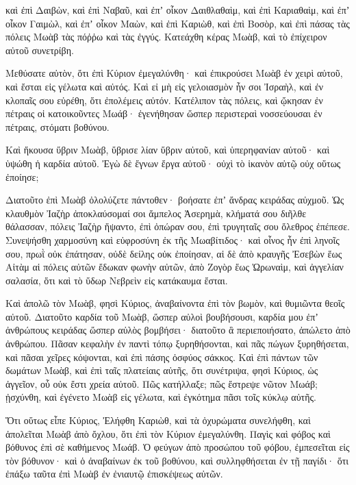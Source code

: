 {καὶ ἐπὶ Δαιβὼν, καὶ ἐπὶ Ναβαῦ, καὶ ἐπʼ οἶκον Δαιθλαθαὶμ,
καὶ ἐπὶ Καριαθαὶμ, καὶ ἐπʼ οἶκον Γαιμὼλ, καὶ ἐπʼ οἶκον Μαὼν,
καὶ ἐπὶ Καριὼθ, καὶ ἐπὶ Βοσὸρ, καὶ ἐπὶ πάσας τὰς πόλεις Μωὰβ τὰς πόῤῥω καὶ τὰς ἐγγύς.
Κατεάχθη κέρας Μωὰβ, καὶ τὸ ἐπίχειρον αὐτοῦ συνετρίβη.
\par }{\PP {}Μεθύσατε αὐτὸν, ὅτι ἐπὶ Κύριον ἐμεγαλύνθη· καὶ ἐπικρούσει Μωὰβ ἐν χειρὶ αὐτοῦ, καὶ ἔσται εἰς γέλωτα καὶ αὐτός.
Καὶ εἰ μὴ εἰς γελοιασμὸν ἦν σοι Ἰσραὴλ, καὶ ἐν κλοπαῖς σου εὑρέθη, ὅτι ἐπολέμεις αὐτόν.
Κατέλιπον τὰς πόλεις, καὶ ᾤκησαν ἐν πέτραις οἱ κατοικοῦντες Μωάβ· ἐγενήθησαν ὥσπερ περιστεραὶ νοσσεύουσαι ἐν πέτραις, στόματι βοθύνου.
\par }{\PP {}Καὶ ἤκουσα ὕβριν Μωὰβ, ὕβρισε λίαν ὕβριν αὐτοῦ, καὶ ὑπερηφανίαν αὐτοῦ· καὶ ὑψώθη ἡ καρδία αὐτοῦ.
Ἐγὼ δὲ ἔγνων ἔργα αὐτοῦ· οὐχὶ τὸ ἱκανὸν αὐτῷ οὐχ οὕτως ἐποίησε;
\par }{\PP {}Διατοῦτο ἐπὶ Μωὰβ ὀλολύζετε πάντοθεν· βοήσατε ἐπʼ ἄνδρας κειράδας αὐχμοῦ.
Ὡς κλαυθμὸν Ἰαζὴρ ἀποκλαύσομαί σοι ἄμπελος Ἀσερημὰ, κλήματά σου διῆλθε θάλασσαν, πόλεις Ἰαζὴρ ἥψαντο, ἐπὶ ὀπώραν σου, ἐπὶ τρυγηταῖς σου ὄλεθρος ἐπέπεσε.
Συνεψήσθη χαρμοσύνη καὶ εὐφροσύνη ἐκ τῆς Μωαβίτιδος· καὶ οἶνος ἦν ἐπὶ ληνοῖς σου, πρωῒ οὐκ ἐπάτησαν, οὐδὲ δείλης οὐκ ἐποίησαν,
αἱ δὲ ἀπὸ κραυγῆς Ἐσεβὼν ἕως Αἰτὰμ αἱ πόλεις αὐτῶν ἔδωκαν φωνὴν αὐτῶν, ἀπὸ Ζογὸρ ἕως Ὠρωναὶμ, καὶ ἀγγελίαν σαλασία, ὅτι καὶ τὸ ὕδωρ Νεβρεὶν εἰς κατάκαυμα ἔσται.
\par }{\PP {}Καὶ ἀπολῶ τὸν Μωὰβ, φησὶ Κύριος, ἀναβαίνοντα ἐπὶ τὸν βωμὸν, καὶ θυμιῶντα θεοῖς αὐτοῦ.
Διατοῦτο καρδία τοῦ Μωὰβ, ὥσπερ αὐλοὶ βουβήσουσι, καρδία μου ἐπʼ ἀνθρώπους κειράδας ὥσπερ αὐλὸς βομβήσει· διατοῦτο ἃ περιεποιήσατο, ἀπώλετο ἀπὸ ἀνθρώπου.
Πᾶσαν κεφαλὴν ἐν παντὶ τόπῳ ξυρηθήσονται, καὶ πᾶς πώγων ξυρηθήσεται, καὶ πᾶσαι χεῖρες κόψονται, καὶ ἐπὶ πάσης ὀσφύος σάκκος.
Καὶ ἐπὶ πάντων τῶν δωμάτων Μωὰβ, καὶ ἐπὶ ταῖς πλατείαις αὐτῆς, ὅτι συνέτριψα, φησὶ Κύριος, ὡς ἀγγεῖον, οὗ οὐκ ἔστι χρεία αὐτοῦ.
Πῶς κατήλλαξε; πῶς ἔστρεψε νῶτον Μωάβ; ᾐσχύνθη, καὶ ἐγένετο Μωὰβ εἰς γέλωτα, καὶ ἐγκότημα πᾶσι τοῖς κύκλῳ αὐτῆς.
\par }{\PP {}Ὅτι οὕτως εἶπε Κύριος,
Ἐλήφθη Καριὼθ, καὶ τὰ ὀχυρώματα συνελήφθη,
καὶ ἀπολεῖται Μωὰβ ἀπὸ ὄχλου, ὅτι ἐπὶ τὸν Κύριον ἐμεγαλύνθη.
Παγὶς καὶ φόβος καὶ βόθυνος ἐπὶ σὲ καθήμενος Μωάβ.
Ὁ φεύγων ἀπὸ προσώπου τοῦ φόβου, ἐμπεσεῖται εἰς τὸν βόθυνον· καὶ ὁ ἀναβαίνων ἐκ τοῦ βοθύνου, καὶ συλληφθήσεται ἐν τῇ παγίδι· ὅτι ἐπάξω ταῦτα ἐπὶ Μωὰβ ἐν ἐνιαυτῷ ἐπισκέψεως αὐτῶν.

}
